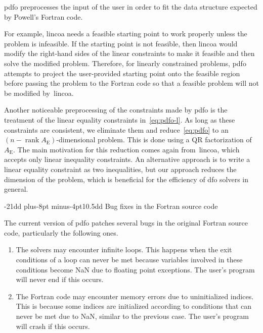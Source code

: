 \documentclass[
    smallextended,  %
    final,          %
]{svjour3}
\makeatletter
\DeclareMathOperator{\rank}{rank}
\newcommand{\aeq}{A_{\scriptscriptstyle\text{E}}}
\def\subsection{\@startsection{subsection}{2}{\z@}%
    {-21dd plus-8pt minus-4pt}{10.5dd}
    {\normalsize\bfseries}}
\makeatother
\begin{document}
\Gls{pdfo} preprocesses the input of the user in order to fit the data structure expected by Powell's Fortran code.

For example, \gls{lincoa} needs a feasible starting point to work properly unless the problem is infeasible.
If the starting point is not feasible, then \gls{lincoa} would modify the right-hand sides of the linear constraints to make it feasible and then solve the modified problem.
Therefore, for linearly constrained problems, \gls{pdfo} attempts to project the user-provided starting point onto the feasible region before passing the problem to the Fortran code so that a feasible problem will not be modified by~\gls{lincoa}.

Another noticeable preprocessing of the constraints made by \gls{pdfo} is the treatment of the linear equality constraints in~\eqref{eq:pdfo-l}.
As long as these constraints are consistent, we eliminate them and reduce~\eqref{eq:pdfo} to an~$(n - \rank \aeq)$-dimensional problem.
This is done using a QR factorization of~$\aeq$.
The main motivation for this reduction comes again from~\gls{lincoa}, which accepts only linear inequality constraints.
An alternative approach is to write a linear equality constraint as two inequalities, but our approach reduces the dimension of the problem, which is beneficial for the efficiency of \gls{dfo} solvers in general.

\subsection{Bug fixes in the Fortran source code}
\label{subsec:bug-corrections}

The current version of \gls{pdfo} patches several bugs in the original Fortran source code, particularly the following ones.
\begin{enumerate}
    \item The solvers may encounter infinite loops.
        This happens when the exit conditions of a loop can never be met because variables involved in these conditions become NaN due to floating point exceptions.
        The user's program will never end if this occurs.
    \item The Fortran code may encounter memory errors due to uninitialized indices.
        This is because some indices are initialized according to conditions that can never be met due to NaN, similar to the previous case.
        The user's program will crash if this occurs.
\end{enumerate}
\end{document}
